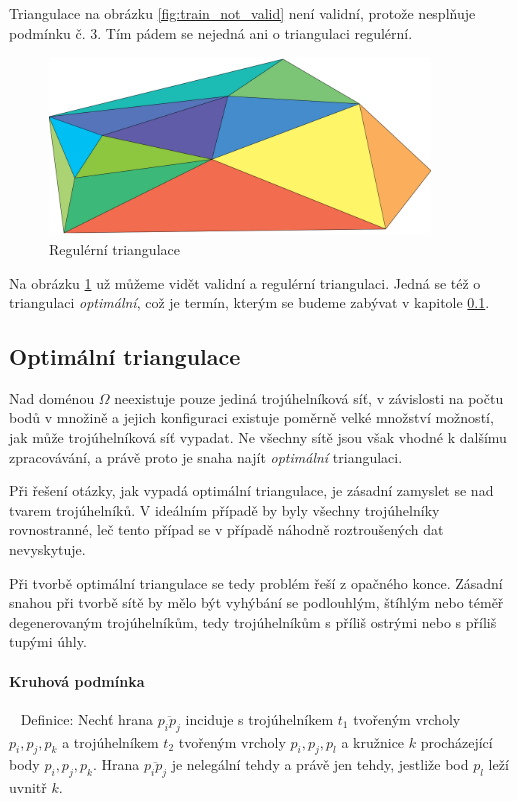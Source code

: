 \documentclass[12pt,a4paper]{article}
\begin{document}
{\newpage

Triangulace na obrázku \ref{fig:train_not_valid} není validní, protože
nesplňuje podmínku č. 3. Tím pádem se nejedná ani o triangulaci
regulérní.

\begin{figure}[h!]
\centering
\includegraphics[width=0.9\textwidth]{img/triangulation.png}
\caption{Regulérní triangulace}
\label{fig:triangulace}
\end{figure}

Na obrázku \ref{fig:triangulace} už můžeme vidět validní a regulérní
triangulaci. Jedná se též o triangulaci \emph{optimální}, což je
termín, kterým se budeme zabývat v kapitole \ref{subsec:Optim_trian}.

\newpage
\subsection{Optimální triangulace}
\label{subsec:Optim_trian}

Nad doménou $\Omega$ neexistuje pouze jediná trojúhelníková síť, v
závislosti na počtu bodů v množině a jejich konfiguraci existuje
poměrně velké množství možností, jak může trojúhelníková síť
vypadat. Ne všechny sítě jsou však vhodné k dalšímu zpracovávání, a
právě proto je snaha najít \emph{optimální} triangulaci.

Při řešení otázky, jak vypadá optimální triangulace, je zásadní
zamyslet se nad tvarem trojúhelníků. V ideálním případě by byly
všechny trojúhelníky rovnostranné, leč tento případ se v případě
náhodně roztroušených dat nevyskytuje.

Při tvorbě optimální triangulace se tedy problém řeší z opačného
konce. Zásadní snahou při tvorbě sítě by mělo být vyhýbání se
podlouhlým, štíhlým nebo téměř degenerovaným trojúhelníkům, tedy
trojúhelníkům s příliš ostrými nebo s příliš tupými úhly.

\paragraph{Kruhová podmínka}
~\newline
Definice: Nechť hrana $\overline{p_ip_j}$ inciduje s trojúhelníkem
$t_1$ tvořeným vrcholy $p_i,p_j,p_k$ a trojúhelníkem $t_2$ tvořeným
vrcholy $p_i,p_j,p_l$ a kružnice $k$ procházející body
$p_i,p_j,p_k$. Hrana $\overline{p_ip_j}$ je nelegální tehdy a právě
jen tehdy, jestliže bod $p_l$ leží uvnitř $k$.

}
\end{document}
